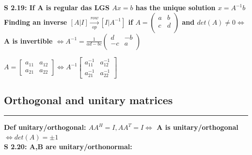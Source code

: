 \documentclass[7pt,landscape, margin = 0.1mm]{article}
\newcommand*{\mysubsection}[1]{\vspace{-2mm}\color{chaptercolor}\subsection{ #1 }
\vspace{-1mm}\hrule\vspace{1.5mm}\color{black}
\vspace{2mm}}
\newcommand{\DEF}[2]{\color{chaptercolor}\bf{Def #1}:\color{black}    \hspace{0.2cm} #2 \\}
\newcommand{\SA}[2]{\color{chaptercolor}\bf{S #1}:\color{black}    \hspace{0.2cm} #2 \\}
\begin{document}
\begin{multicols}{4}
\begin{flushleft}
{\begin{itemize}
\end{itemize}}
\SA{2.19}{If A is regular das LGS $Ax=b$ has the unique solution $x = A^{-1}b$}
Finding an inverse $ \left [ A |I  \right ] \xrightarrow[op]{row}\left [ I| A^{-1}  \right ] $
if $A = \begin{pmatrix}
 a&b  \\
c & d \\
\end{pmatrix}$ and $det(A) \neq 0 \Leftrightarrow $ A is invertible $ \Leftrightarrow A^{-1}= \frac{1}{ad-bc}\begin{pmatrix}
 d&-b  \\
-c & a \\
\end{pmatrix}$ 


$ A =  \left[ 
\begin{array}{c|c} 
  a_{11} & a_{12} \\ 
  \hline 
  a_{21} & a_{22} 
\end{array} 
\right] \Leftrightarrow A^{-1}  \left[ 
\begin{array}{c|c} 
  a_{11}^{-1}  & a_{12}^{-1}  \\ 
  \hline 
  a_{21}^{-1}  & a_{22} ^{-1} 
\end{array} 
\right] $
\mysubsection{\centering Orthogonal and unitary matrices}
\DEF{unitary/orthogonal}{$AA^H=I, AA^T=I \Leftrightarrow $ A is unitary/orthogonal $ \Leftrightarrow det(A) = \pm 1$}
\SA{2.20}{A,B are unitary/orthonormal:
\begin{itemize}


\end{itemize}}
\end{flushleft}
\end{multicols}
\end{document}
